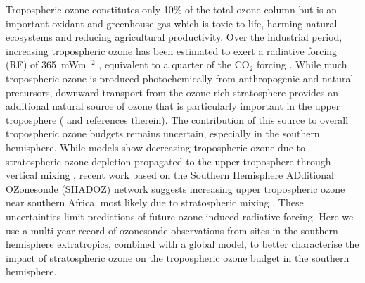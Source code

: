 
Tropospheric ozone constitutes only 10\% of the total ozone column but is an important oxidant and greenhouse gas which is toxic to life, harming natural ecosystems and reducing agricultural productivity.
Over the industrial period, increasing tropospheric ozone has been estimated to exert a radiative forcing (RF) of 365~mWm$^{-2}$  \citep{Stevenson2013}, equivalent to a quarter of the CO$_2$ forcing \citep{IPCC_Chapter2}. 
While much tropospheric ozone is produced photochemically from anthropogenic and natural precursors, %
downward transport from the ozone-rich stratosphere provides an additional natural source of ozone that is particularly important in the upper troposphere (\citet{Jacobson2000} and references therein).
The contribution of this source to overall tropospheric ozone budgets remains uncertain, especially in the southern hemisphere.
While models show decreasing tropospheric ozone due to stratospheric ozone depletion propagated to the upper troposphere through vertical mixing \citep{Stevenson2013}, recent work based on the  Southern Hemisphere ADditional OZonesonde (SHADOZ) network suggests increasing upper tropospheric ozone near southern Africa, most likely due to stratospheric mixing \citep{Liu2015, Thompson2014}.
These uncertainties limit predictions of future ozone-induced radiative forcing.
Here we use a multi-year record of ozonesonde observations from sites in the southern hemisphere extratropics, combined with a global model, to better characterise the impact of stratospheric ozone on the tropospheric ozone budget in the southern hemisphere.


